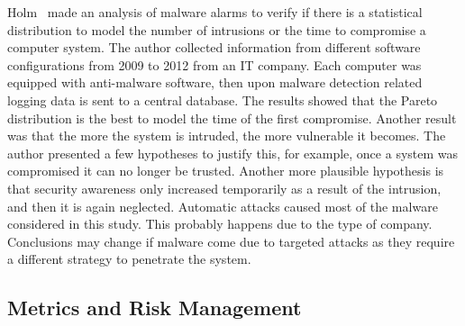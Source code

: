 Holm~\cite{Holm:2014} made an analysis of malware alarms to verify if there is a statistical distribution to model the number of intrusions or the time to compromise a computer system.
The author collected information from different software configurations from 2009 to 2012 from an IT company.
Each computer was equipped with anti-malware software, then upon malware detection related logging data is sent to a central database.
The results showed that the Pareto distribution is the best to model the time of the first compromise.
Another result was that the more the system is intruded, the more vulnerable it becomes. 
The author presented a few hypotheses to justify this, for example, once a system was compromised it can no longer be trusted. 
Another more plausible hypothesis is that security awareness only increased temporarily as a result of the intrusion, and then it is again neglected.
Automatic attacks caused most of the malware considered in this study.
This probably happens due to the type of company. 
Conclusions may change if malware come due to targeted attacks as they require a different strategy to penetrate the system.


\subsection{Metrics and Risk Management}



